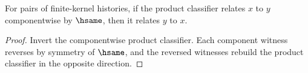 \begin{theorem}
\label{thm:prod-classifier-hsame-symm}
For pairs of finite-kernel histories, if the product classifier relates \(x\) to \(y\) componentwise by \(\hsame\), then it relates \(y\) to \(x\).
\end{theorem}
\begin{proof}
Invert the componentwise product classifier. Each component witness reverses by symmetry of \(\hsame\), and the reversed witnesses rebuild the product classifier in the opposite direction.
\end{proof}
